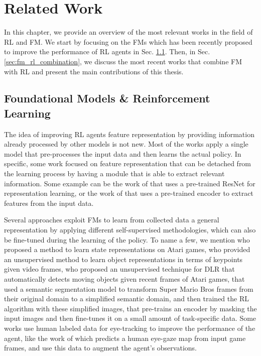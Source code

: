 
\chapter{Related Work}
\label{ch:related_work}
In this chapter, we provide an overview of the most relevant works in the field of RL and FM\@.
We start by focusing on the FMs which has been recently proposed to improve the performance of RL agents in Sec. \ref{sec:fm_rl}.
Then, in Sec. \ref{sec:fm_rl_combination}, we discuss the most recent works that combine FM with RL and present the main contributions of this thesis.

\section{Foundational Models \& Reinforcement Learning}\label{sec:fm_rl}
The idea of improving RL agents feature representation by providing information already processed by other models is not new.
Most of the works apply a single model that pre-processes the input data and then learns the actual policy.
In specific, some work focused on feature representation that can be detached from the learning process by having a module that is able to extract relevant information.
Some example can be the work of \citet{shah2021rrl} that uses a pre-trained ResNet for representation learning, or the work of \citet{yuan2022pre} that uses a pre-trained encoder to extract features from the input data.

Several approaches exploit FMs to learn from collected data a general representation by applying different self-supervised methodologies, which can also be fine-tuned during the learning of the policy.
To name a few, we mention \citet{anand2019unsupervised} who proposed a method to learn state representations on Atari games, \citet{kulkarni2019unsupervised} who provided an unsupervised method to learn object representations in terms of keypoints given video frames, \citet{goel2018unsupervised} who proposed an unsupervised technique for DLR that automatically detects moving objects given recent frames of Atari games, \citet{montalvo2023exploiting} that used a semantic segmentation model to transform Super Mario Bros frames from their original domain to a simplified semantic domain, and then trained the RL algorithm with these simplified images, \citet{xiao2022masked} that pre-trains an encoder by masking the input images and then fine-tunes it on a small amount of task-specific data.
Some works use human labeled data for eye-tracking \citep{zhang2020atari} to improve the performance of the agent, like the work of \citet{thammineni2023selective} which predicts a human eye-gaze map from input game frames, and use this data to augment the agent's observations.

